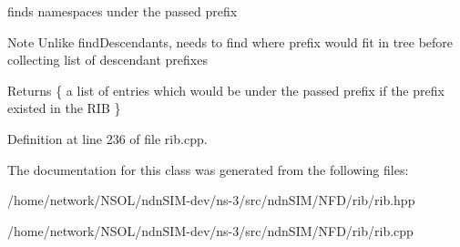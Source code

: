 finds namespaces under the passed prefix 

\begin{DoxyNote}{Note}
Unlike find\+Descendants, needs to find where prefix would fit in tree before collecting list of descendant prefixes
\end{DoxyNote}
\begin{DoxyReturn}{Returns}
\{ a list of entries which would be under the passed prefix if the prefix existed in the R\+IB \} 
\end{DoxyReturn}


Definition at line 236 of file rib.\+cpp.



The documentation for this class was generated from the following files\+:\begin{DoxyCompactItemize}
\item 
/home/network/\+N\+S\+O\+L/ndn\+S\+I\+M-\/dev/ns-\/3/src/ndn\+S\+I\+M/\+N\+F\+D/rib/rib.\+hpp\item 
/home/network/\+N\+S\+O\+L/ndn\+S\+I\+M-\/dev/ns-\/3/src/ndn\+S\+I\+M/\+N\+F\+D/rib/rib.\+cpp\end{DoxyCompactItemize}
